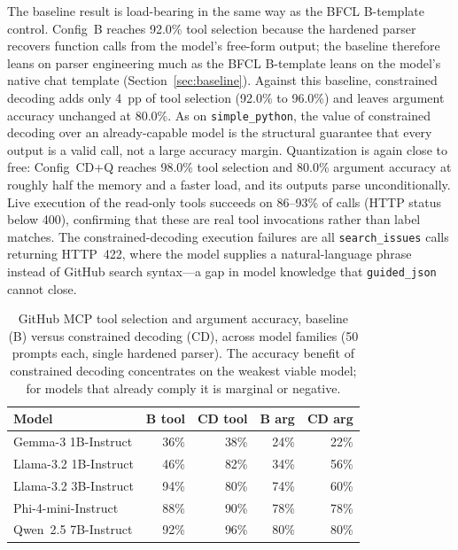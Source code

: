 The baseline result is load-bearing in the same way as the BFCL B-template
control. Config~B reaches 92.0\% tool selection because the hardened parser
recovers function calls from the model's free-form output; the baseline
therefore leans on parser engineering much as the BFCL B-template leans on the
model's native chat template (Section~\ref{sec:baseline}). Against this
baseline, constrained decoding adds only 4~pp of tool selection (92.0\% to
96.0\%) and leaves argument accuracy unchanged at 80.0\%. As on
\texttt{simple\_python}, the value of constrained decoding over an
already-capable model is the structural guarantee that every output is a valid
call, not a large accuracy margin. Quantization is again close to free:
Config~CD+Q reaches 98.0\% tool selection and 80.0\% argument accuracy at
roughly half the memory and a faster load, and its outputs parse
unconditionally. Live execution of the read-only tools succeeds on 86--93\% of
calls (HTTP status below 400), confirming that these are real tool invocations
rather than label matches. The constrained-decoding execution failures are all
\texttt{search\_issues} calls returning HTTP~422, where the model supplies a
natural-language phrase instead of GitHub search syntax---a gap in model
knowledge that \texttt{guided\_json} cannot close.

\begin{table}[ht]
\centering
\caption{GitHub MCP tool selection and argument accuracy, baseline (B) versus
constrained decoding (CD), across model families (50 prompts each, single hardened
parser). The accuracy benefit of constrained decoding concentrates on the weakest
viable model; for models that already comply it is marginal or negative.}
\label{tab:github-mcp-cross-family}
\begin{tabular}{lrrrr}
\toprule
Model & B tool & CD tool & B arg & CD arg \\
\midrule
Gemma-3 1B-Instruct         & 36\% & 38\% & 24\% & 22\% \\
Llama-3.2 1B-Instruct       & 46\% & 82\% & 34\% & 56\% \\
Llama-3.2 3B-Instruct       & 94\% & 80\% & 74\% & 60\% \\
Phi-4-mini-Instruct         & 88\% & 90\% & 78\% & 78\% \\
Qwen~2.5 7B-Instruct        & 92\% & 96\% & 80\% & 80\% \\
\bottomrule
\end{tabular}
\end{table}

